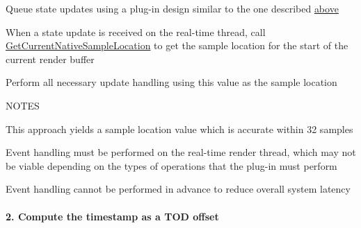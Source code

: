 \begin{DoxyEnumerate}
\item Queue state updates using a plug-\/in design similar to the one described \mbox{\hyperlink{a00821_parameterUpdateTiming_resolvingOffsets}{above}}  
\item When a state update is received on the real-\/time thread, call \mbox{\hyperlink{a01885_a8119233b03774528ffaa519771d792a0}{Get\+Current\+Native\+Sample\+Location}} to get the sample location for the start of the current render buffer  
\item Perform all necessary update handling using this value as the sample location  
\end{DoxyEnumerate}

N\+O\+T\+ES \begin{DoxyItemize}
\item This approach yields a sample location value which is accurate within 32 samples \item Event handling must be performed on the real-\/time render thread, which may not be viable depending on the types of operations that the plug-\/in must perform \item Event handling cannot be performed in advance to reduce overall system latency\end{DoxyItemize}
\hypertarget{a00821_parameterUpdateTiming_determiningTimelinePosition_2}{}\paragraph{2. Compute the timestamp as a T\+O\+D offset}\label{a00821_parameterUpdateTiming_determiningTimelinePosition_2}

